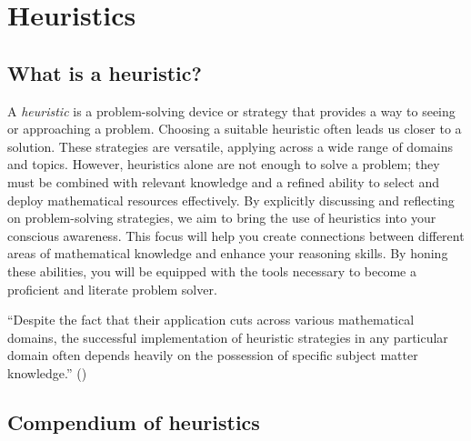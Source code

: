 \documentclass[
  a4paper,
  DIV=11,
  numbers=noendperiod,
  oneside]{scrreprt}
\begin{document}
\chapter{Heuristics}\label{sec-heuristics}

\section{What is a heuristic?}\label{what-is-a-heuristic}

A \emph{heuristic} is a problem-solving device or strategy that provides
a way to seeing or approaching a problem. Choosing a suitable heuristic
often leads us closer to a solution. These strategies are versatile,
applying across a wide range of domains and topics. However, heuristics
alone are not enough to solve a problem; they must be combined with
relevant knowledge and a refined ability to select and deploy
mathematical resources effectively. By explicitly discussing and
reflecting on problem-solving strategies, we aim to bring the use of
heuristics into your conscious awareness. This focus will help you
create connections between different areas of mathematical knowledge and
enhance your reasoning skills. By honing these abilities, you will be
equipped with the tools necessary to become a proficient and literate
problem solver.

\begin{tcolorbox}[enhanced jigsaw, opacitybacktitle=0.6, breakable, colbacktitle=quarto-callout-warning-color!10!white, left=2mm, bottomrule=.15mm, arc=.35mm, colback=white, toptitle=1mm, toprule=.15mm, bottomtitle=1mm, opacityback=0, colframe=quarto-callout-warning-color-frame, coltitle=black, rightrule=.15mm, titlerule=0mm, leftrule=.75mm, title=\textcolor{quarto-callout-warning-color}{\faExclamationTriangle}\hspace{0.5em}{Heuristics will not replace shaky mastery of a subject!}]

``Despite the fact that their application cuts across various
mathematical domains, the successful implementation of heuristic
strategies in any particular domain often depends heavily on the
possession of specific subject matter knowledge.''
()

\end{tcolorbox}

\section{Compendium of heuristics}\label{compendium-of-heuristics}
\end{document}
